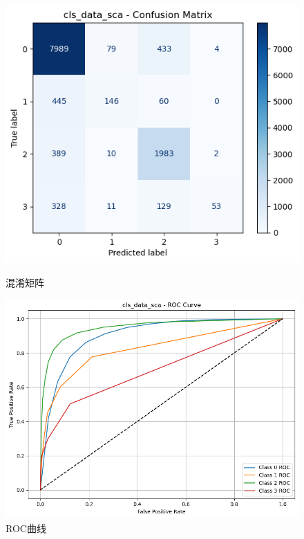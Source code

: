 \documentclass[10pt]{article}
\begin{document}
\begin{figure}[H]
\centering
\begin{minipage}[t]{0.45\textwidth}
  \centering
  \includegraphics[width=\linewidth]{cls_knn_sca1.png}
  \caption{混淆矩阵}
  \label{fig:22}
\end{minipage}
\hfill
\begin{minipage}[t]{0.52\textwidth}
  \centering
  \includegraphics[width=\linewidth]{cls_knn_sca2.png}
  \caption{ROC曲线}
  \label{fig:23}
\end{minipage}
\end{figure}
\end{document}
